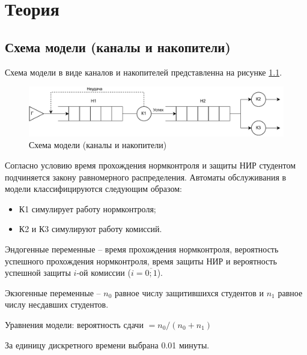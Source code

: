 \chapter{Теория}
\section{Схема модели (каналы и накопители)}

Схема модели в виде каналов и накопителей представленна на рисунке \ref{s2}.

\begin{figure}[h]
	\includegraphics[width=1\linewidth]{"inc/img/Каналы и накопители.drawio.pdf"}
	\caption{Схема модели (каналы и накопители)}
	\label{s2}
\end{figure}

Согласно условию время прохождения нормконтроля и защиты НИР студентом подчиняется закону равномерного распределения. Автоматы обслуживания в модели классифицируются следующим образом:
\begin{itemize}
	\item К1 симулирует работу нормконтроля;
	\item К2 и К3 симулируют работу комиссий.
\end{itemize}

Эндогенные переменные -- время прохождения нормконтроля, вероятность успешного прохождения нормконтроля, время защиты НИР и вероятность успешной защиты $i$-ой комиссии ($i = \overline{0;1}$).

Экзогенные переменные -- $n_0$ равное числу защитившихся студентов и $n_1$ равное числу несдавших студентов.

Уравнения модели: вероятность сдачи $= n_0/(n_0+n_1)$

За единицу дискретного времени выбрана 0.01 минуты.
